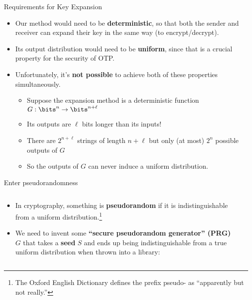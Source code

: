 \documentclass[aspectratio=169, lualatex, handout]{beamer}
\begin{document}
\begin{frame}{Requirements for Key Expansion}
	\begin{itemize}[<+->]
		\item Our method would need to be \textbf{deterministic}, so that both the sender and receiver can expand their key in the same way (to encrypt/decrypt).
		\item Its output distribution would need to be \textbf{uniform}, since that is a crucial property for the security of OTP.
		\item Unfortunately, it's \textbf{not possible} to achieve both of these properties simultaneously.
		      \begin{itemize}[<+->]
			      \item Suppose the expansion method is a deterministic function $G: \bits^n \rightarrow \bits^{n+\ell}$
			      \item Its outputs are $\ell$ bits longer than its inputs!
			      \item There are $2^{n+\ell}$ strings of length $n+\ell$ but only (at most) $2^n$ possible outputs of $G$
			      \item So the outputs of $G$ can never induce a uniform distribution.
		      \end{itemize}
	\end{itemize}
\end{frame}

\begin{frame}{Enter pseudorandomness}
	\begin{columns}[c]
		\begin{column}{0.5\textwidth}
			\begin{itemize}[<+->]
				\item In cryptography, something is \textbf{pseudorandom} if it is indistinguishable from a uniform distribution.\footnote{The Oxford English Dictionary defines the prefix pseudo- as ``apparently but not really.''}
				\item We need to invent some \textbf{``secure pseudorandom generator'' (PRG)} $G$ that takes a \textbf{seed} $S$ and ends up being indistinguishable from a true uniform distribution when thrown into a library:
			\end{itemize}
		\end{column}
		\begin{column}{0.5\textwidth}
		\end{column}
	\end{columns}
\end{frame}
\end{document}
